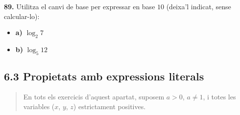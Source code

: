 \documentclass[13pt,a4paper]{extarticle}
\begin{document}
\par\noindent\begin{minipage}{\linewidth}
\textbf{89.} Utilitza el canvi de base per expressar en base $10$ (deixa'l indicat, sense calcular-lo):\par

\begin{itemize}[leftmargin=0pt,itemsep=3pt,topsep=3pt,parsep=0pt,label={}]
\item \textbf{a)} $\log_2 7$
\item \textbf{b)} $\log_5 12$
\end{itemize}
\end{minipage}\par\vspace{1.6mm}
\subsection*{6.3 Propietats amb expressions literals}

\begin{quote}\small En tots els exercicis d'aquest apartat, suposem $a>0$, $a\neq1$, i totes les variables ($x$, $y$, $z$) estrictament positives.\end{quote}
\end{document}
